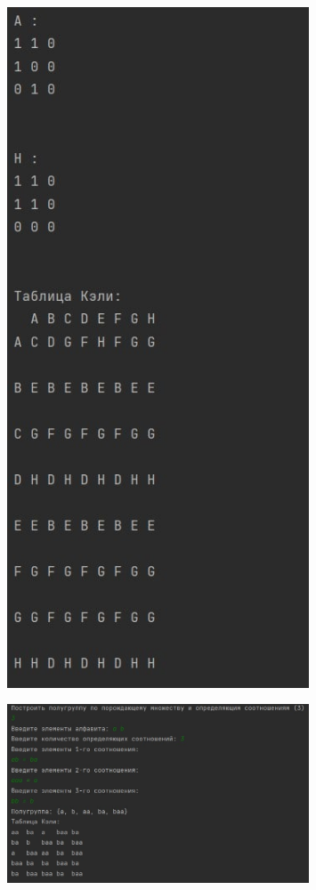 \documentclass[bachelor, och, labwork]{shiza}
\begin{document}
        \begin{figure}[H]
            \centering
            \includegraphics[width=0.8\textwidth]{pic/4.jpg}
            \caption{}
        \end{figure}

        \begin{figure}[H]
            \centering
            \includegraphics[width=0.8\textwidth]{pic/5.jpg}
            \caption{}
        \end{figure}
\end{document}
